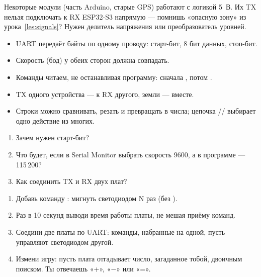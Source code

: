 
\begin{caution}
Некоторые модули (часть Arduino, старые GPS) работают с логикой 5~В. Их TX нельзя подключать к RX
ESP32-S3 напрямую --- помнишь «опасную зону» из урока~\ref{les:signals}? Нужен делитель напряжения
или преобразователь уровней.
\end{caution}

\begin{summary}
\begin{itemize}[leftmargin=*]
  \item UART передаёт байты по одному проводу: старт-бит, 8 бит данных, стоп-бит.
  \item Скорость (бод) у обеих сторон должна совпадать.
  \item Команды читаем, не останавливая программу: сначала , потом .
  \item TX одного устройства --- к RX другого, земли --- вместе.
  \item Строки  можно сравнивать, резать и превращать в числа; цепочка // выбирает одно действие из многих.
\end{itemize}
\end{summary}

\begin{quiz}
\begin{enumerate}
  \item Зачем нужен старт-бит?
  \item Что будет, если в Serial Monitor выбрать скорость 9600, а в программе --- 115\,200?
  \item Как соединить TX и RX двух плат?
\end{enumerate}
\end{quiz}

\begin{tasks}
\begin{enumerate}
  \item Добавь команду : мигнуть светодиодом N раз (без ).
  \item Раз в 10 секунд выводи время работы платы, не мешая приёму команд.
  \item Соедини две платы по UART: команды, набранные на одной, пусть управляют светодиодом другой.
  \item Измени игру: пусть плата отгадывает число, загаданное тобой, двоичным поиском. Ты отвечаешь «+», «−» или «=».
\end{enumerate}
\end{tasks}
